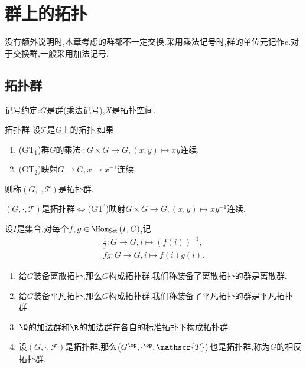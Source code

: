 \chapter{群上的拓扑}

没有额外说明时,本章考虑的群都不一定交换.采用乘法记号时,群的单位元记作$e$.对于交换群,一般采用加法记号.

\section{拓扑群}

记号约定:$G$是群(乘法记号),$X$是拓扑空间.

\begin{definition}{拓扑群}{}
	设$\mathscr{T}$是$G$上的拓扑.如果
	\begin{enumerate}
		\item ($\mathrm{GT}_{1}$)群$G$的乘法$\cdot:G\times G\to G,\left(x,y\right)\mapsto xy$连续,
		\item ($\mathrm{GT}_{2}$)映射$G\to G,x\mapsto x^{-1}$连续,
	\end{enumerate}
	则称$\left(G,\cdot,\mathscr{T}\right)$是拓扑群.
\end{definition}

\begin{remark}{}{}
	$\left(G,\cdot,\mathscr{T}\right)$是拓扑群$\iff$($\mathrm{GT}^{\prime}$)映射$G\times G\to G,\left(x,y\right)\mapsto xy^{-1}$连续.
\end{remark}

\begin{convention}{}{}
	设$I$是集合.对每个$f,g\in\Hom_{\mathsf{Set}}\left(I,G\right)$,记
	\begin{gather*}
		\frac{1}{f}:G\to G,i\mapsto\left(f\left(i\right)\right)^{-1},\\
		fg:G\to G,i\mapsto f\left(i\right)g\left(i\right).
	\end{gather*}
\end{convention}

\begin{example}{}{}
	\begin{enumerate}
		\item 给$G$装备离散拓扑,那么$G$构成拓扑群.我们称装备了离散拓扑的群是离散群.
		\item 给$G$装备平凡拓扑,那么$G$构成拓扑群.我们称装备了平凡拓扑的群是平凡拓扑群.
		\item $\Q$的加法群和$\R$的加法群在各自的标准拓扑下构成拓扑群.
		\item 设$\left(G,\cdot,\mathscr{F}\right)$是拓扑群,那么$\left(G^{\op},\cdot^{\op},\mathscr{T}\right)$也是拓扑群,称为$G$的相反拓扑群.
	\end{enumerate}
\end{example}

